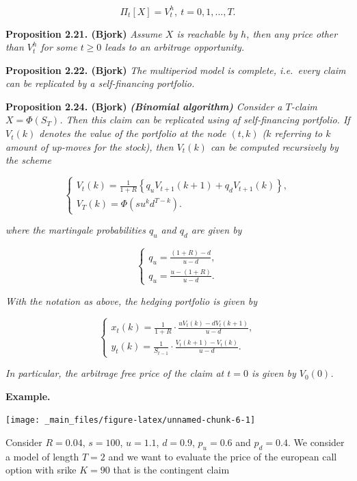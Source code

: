 \documentclass[
]{book}
\begin{document}
\[
\Pi_t[X]=V_t^h,\ t=0,1,...,T.
\]

\textbf{Proposition 2.21. (Bjork)} \emph{Assume \(X\) is reachable by \(h\), then any price other than \(V_t^h\) for some \(t\ge 0\) leads to an arbitrage opportunity.}

\textbf{Proposition 2.22. (Bjork)} \emph{The multiperiod model is complete, i.e.~every claim can be replicated by a self-financing portfolio.}

\textbf{Proposition 2.24. (Bjork)} \emph{\textbf{(Binomial algorithm)} Consider a \(T\)-claim \(X=\Phi(S_T)\). Then this claim can be replicated using af self-financing portfolio. If \(V_t(k)\) denotes the value of the portfolio at the node \((t,k)\) (\(k\) referring to \(k\) amount of up-moves for the stock), then \(V_t(k)\) can be computed recursively by the scheme}

\[
\left\{\begin{matrix}V_t(k)=\frac{1}{1+R}\left\{q_uV_{t+1}(k+1)+q_dV_{t+1}(k)\right\},\\ V_T(k)=\Phi(su^kd^{T-k}).\end{matrix}\right.
\]

\emph{where the martingale probabilities \(q_u\) and \(q_d\) are given by}

\[
\left\{\begin{matrix}q_u=\frac{(1+R)-d}{u-d},\\ q_u=\frac{u-(1+R)}{u-d}.\end{matrix}\right.
\]

\emph{With the notation as above, the hedging portfolio is given by}

\[
\left\{\begin{matrix}x_t(k)=\frac{1}{1+R}\cdot\frac{uV_t(k)-dV_t(k+1)}{u-d},\\ y_t(k)=\frac{1}{S_{t-1}}\cdot\frac{V_t(k+1)-V_t(k)}{u-d}.\end{matrix}\right.
\]

\emph{In particular, the arbitrage free price of the claim at \(t=0\) is given by \(V_0(0)\).}

\textbf{Example.}

\begin{center}\texttt{[image: \_main\_files/figure-latex/unnamed-chunk-6-1]} \end{center}

Consider \(R=0.04\), \(s=100\), \(u=1.1\), \(d=0.9\), \(p_u=0.6\) and \(p_d=0.4\). We consider a model of length \(T=2\) and we want to evaluate the price of the european call option with srike \(K=90\) that is the contingent claim
\end{document}
